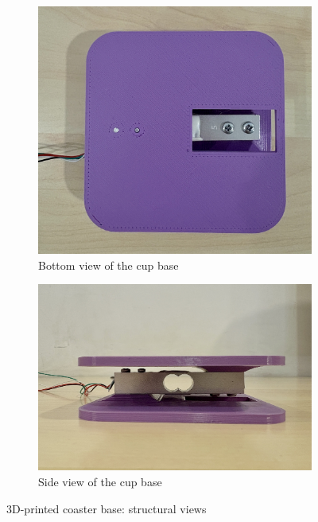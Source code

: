 \begin{figure}[H]
    \centering
    \begin{subfigure}[b]{0.45\linewidth}
        \centering
        \includegraphics[width=\linewidth]{assets/setup_images/base-bottom-view.jpg}
        \caption{Bottom view of the cup base}
        \label{fig:base-bottom}
    \end{subfigure}
    \hfill
    \begin{subfigure}[b]{0.45\linewidth}
        \centering
        \includegraphics[width=\linewidth]{assets/setup_images/base-side-view.jpg}
        \caption{Side view of the cup base}
        \label{fig:base-side}
    \end{subfigure}
    \caption{3D-printed coaster base: structural views}
    \label{fig:cup-base-views}
\end{figure}

